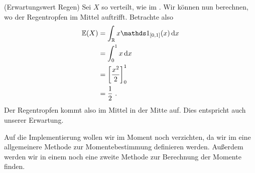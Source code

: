 \begin{Beispiel}{(Erwartungswert Regen)}
\hypertarget{Bsp:ErwRegen}{}Sei $X$ so verteilt, wie im \hyperlink{Bsp:Regen}{}. Wir können nun berechnen, wo der Regentropfen im Mittel auftrifft. Betrachte also
\begin{align*}
\mathbb{E}(X) &= \int_\mathbb{R} x \indi_{[0, 1]}(x) \d x\\
&= \int_0^1 x \d x\\
&= \left[ \frac{x^2}{2} \right]_0^1\\
&= \frac{1}{2}~.
\end{align*}
Der Regentropfen kommt also im Mittel in der Mitte auf. Dies entspricht auch unserer Erwartung.
\end{Beispiel}

\newpage

Auf die Implementierung wollen wir im Moment noch verzichten, da wir im \hyperlink{Sec:MomGenFun}{} eine allgemeinere Methode zur Momentebestimmung definieren werden. Außerdem werden wir in einem \hyperlink{Sec:MomErzFun}{} noch eine zweite Methode zur Berechnung der Momente finden.

